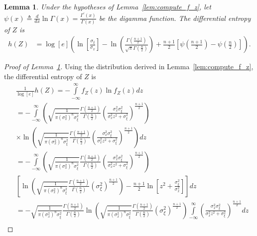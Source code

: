 \documentclass[12pt,onecolumn, margin=1in]{IEEEtran}
\newtheorem{lemma}[theorem]{Lemma}
\newcommand{\bracket}[1]{\left[ #1 \right]}
\newcommand{\paren}[1]{\left( #1 \right)}
\newcommand{\sigx}{\sigma_x}
\newcommand{\sigxi}{\sigma_\xi}
\begin{document}
\begin{lemma}\label{lem:diff_ent_Ex}
    Under the hypotheses of Lemma~\ref{lem:compute_f_z}, let $\psi(x) \triangleq \frac{d}{dx}\ln{\Gamma(x)} = \frac{\Gamma^\prime(x)}{\Gamma(x)}$ be the digamma function. The differential entropy of $Z$ is
\begin{align}
    \label{eq:diff_ent_Ex}
    h(Z) &= \log\bracket{e}\paren{\ln\bracket{\frac{\sigxi}{\sigx}} - \ln{\paren{\frac{\Gamma\paren{\frac{n+1}{2}}}{\sqrt{\pi}\Gamma\paren{\frac{n}{2}}}}} + \frac{n + 1}{2}\bracket{\psi\paren{\frac{n+1}{2}} - \psi\paren{\frac{n}{2}}}}.
\end{align}
\end{lemma}


\begin{proof}[Proof of Lemma~\ref{lem:diff_ent_Ex}]
    Using the distribution derived in Lemma~\ref{lem:compute_f_z}, the differential entropy of $Z$ is
\begin{align}
    &\frac{1}{\log\bracket{e}}h(Z) = -\int\limits_{-\infty}^\infty f_Z(z)\ln{f_Z(z)}dz\\
     &= -\int\limits_{-\infty}^\infty \paren{\sqrt{\frac{1}{\pi\paren{\sigx^2}^n\sigxi^2}}\frac{\Gamma\paren{\frac{n+1}{2}}}{\Gamma\paren{\frac{n}{2}}}\paren{\frac{\sigx^2\sigxi^2}{\sigx^2z^2 + \sigxi^2}}^{\frac{n + 1}{2}}}\\
     &\times\ln{\paren{\sqrt{\frac{1}{\pi\paren{\sigx^2}^n\sigxi^2}}\frac{\Gamma\paren{\frac{n+1}{2}}}{\Gamma\paren{\frac{n}{2}}}\paren{\frac{\sigx^2\sigxi^2}{\sigx^2z^2 + \sigxi^2}}^{\frac{n + 1}{2}}}}dz\\
     &= -\int\limits_{-\infty}^\infty \paren{\sqrt{\frac{1}{\pi\paren{\sigx^2}^n\sigxi^2}}\frac{\Gamma\paren{\frac{n+1}{2}}}{\Gamma\paren{\frac{n}{2}}}\paren{\frac{\sigx^2\sigxi^2}{\sigx^2z^2 + \sigxi^2}}^{\frac{n + 1}{2}}}\nonumber\\
     &\bracket{ \ln{\paren{\sqrt{\frac{1}{\pi\paren{\sigx^2}^n\sigxi^2}}\frac{\Gamma\paren{\frac{n+1}{2}}}{\Gamma\paren{\frac{n}{2}}}\paren{\sigxi^2}^{\frac{n + 1}{2}}}}- \frac{n + 1}{2}\ln\bracket{z^2 + \frac{\sigxi^2}{\sigx^2}}}dz\\
     &= -\sqrt{\frac{1}{\pi\paren{\sigx^2}^n\sigxi^2}}\frac{\Gamma\paren{\frac{n+1}{2}}}{\Gamma\paren{\frac{n}{2}}} \ln{\paren{\sqrt{\frac{1}{\pi\paren{\sigx^2}^n\sigxi^2}}\frac{\Gamma\paren{\frac{n+1}{2}}}{\Gamma\paren{\frac{n}{2}}}\paren{\sigxi^2}^{\frac{n + 1}{2}}}}\int\limits_{-\infty}^\infty \paren{\frac{\sigx^2\sigxi^2}{\sigx^2z^2 + \sigxi^2}}^{\frac{n + 1}{2}} dz\\

\end{align}
\end{proof}
\end{document}
